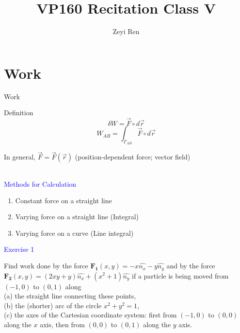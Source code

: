 \documentclass{beamer}
\title{VP160 Recitation Class V}
\author{Zeyi Ren}
\institute{UM-SJTU Joint Institute}
\begin{document}
\maketitle

\section{Work}
\begin{frame}{Work}
  \begin{block}{Definition}
    \begin{equation}\delta W = \vec{F}\circ d\vec{r}\end{equation}
    \begin{equation}
    W_{AB}=\int_{\Gamma_{A B}} \vec{F}\circ d\vec{r} 
    \end{equation}
    \begin{center}In general, $\vec{F} = \vec{F}(\vec{r})$ (position-dependent force; vector field)\end{center}
  \end{block}
  \pause
  ~\\
  \textcolor{blue}{Methods for Calculation}\\
\begin{enumerate}
  \item Constant force on a straight line
  \item Varying force on a straight line (Integral)
  \item Varying force on a curve (Line integral)
\end{enumerate}
\end{frame}

\begin{frame}
\textcolor{blue}{Exercise 1}

Find work done by the force $\mathbf{F_1}(x,y) = -x\hat{n_x} -y\hat{n_y}$ and by the force $\mathbf{F_2}(x,y) = (2xy + y)\hat{n_x} + (x^2 + 1)\hat{n_y}$ if a particle is being moved from $(-1, 0)$ to $(0, 1)$ along\\
(a) the straight line connecting these points,\\
(b) the (shorter) arc of the circle $x^2 + y^2 = 1$,\\
(c) the axes of the Cartesian coordinate system: first from $(-1, 0)$ to $(0, 0)$ along the $x$ axis, then from $(0, 0)$ to $(0, 1)$ along the $y$ axis.
\end{frame}
\end{document}

